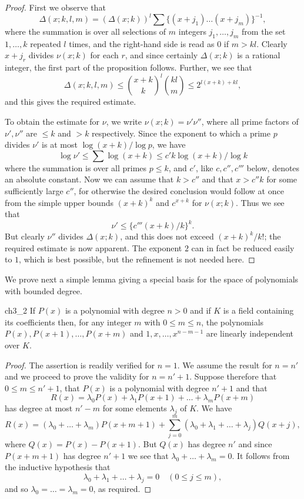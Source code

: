 \begin{proof}
First we observe that
\[
\Delta(x; k, l, m) = (\Delta(x; k))^l \sum \{(x+j_1) \dots (x+j_m)\}^{-1},
\]
where the summation is over all selections of $m$ integers $j_1, \dots, j_m$ from the set $1, \dots, k$ repeated $l$ times, and the right-hand side is read as $0$ if $m > kl$. Clearly $x+j_r$ divides $\nu(x;k)$ for each $r$, and since certainly $\Delta(x;k)$ is a rational integer, the first part of the proposition follows. Further, we see that
\[
\Delta(x; k, l, m) \le \binom{x+k}{k}^l \binom{kl}{m} \le 2^{l(x+k)+kl},
\]
and this gives the required estimate.

To obtain the estimate for $\nu$, we write $\nu(x; k) = \nu' \nu''$, where all prime factors of $\nu', \nu''$ are $\le k$ and $> k$ respectively. Since the exponent to which a prime $p$ divides $\nu'$ is at most $\log (x+k)/\log p$, we have
\[
\log \nu' \le \sum \log (x+k) \le c' k \log (x+k)/\log k
\]
where the summation is over all primes $p \le k$, and $c'$, like $c, c'', c'''$ below, denotes an absolute constant. Now we can assume that $k > c''$ and that $x > c''k$ for some sufficiently large $c''$, for otherwise the desired conclusion would follow at once from the simple upper bounds $(x+k)^k$ and $c^{x+k}$ for $\nu(x;k)$. Thus we see that
\[
\nu' \le \{c'''(x+k)/k\}^k.
\]
But clearly $\nu''$ divides $\Delta(x; k)$, and this does not exceed $(x+k)^k/k!$; the required estimate is now apparent. The exponent $2$ can in fact be reduced easily to $1$, which is best possible, but the refinement is not needed here.
\end{proof}

We prove next a simple lemma giving a special basis for the space of polynomials with bounded degree.

\begin{mylemma}{}{ch3_2}
If $P(x)$ is a polynomial with degree $n > 0$ and if $K$ is a field containing its coefficients then, for any integer $m$ with $0 \le m \le n$, the polynomials $P(x), P(x+1), \dots, P(x+m)$ and $1, x, \dots, x^{n-m-1}$ are linearly independent over $K$.
\end{mylemma}

\begin{proof}
The assertion is readily verified for $n = 1$. We assume the result for $n = n'$ and we proceed to prove the validity for $n = n' + 1$. Suppose therefore that $0 \le m \le n' + 1$, that $P(x)$ is a polynomial with degree $n' + 1$ and that
\[
R(x) = \lambda_0 P(x) + \lambda_1 P(x+1) + \dots + \lambda_m P(x+m)
\]
has degree at most $n'-m$ for some elements $\lambda_j$ of $K$. We have
\[
R(x) = (\lambda_0 + \dots + \lambda_m) P(x+m+1) + \sum_{j=0}^m (\lambda_0 + \lambda_1 + \dots + \lambda_j) Q(x+j),
\]
where $Q(x) = P(x) - P(x+1)$. But $Q(x)$ has degree $n'$ and since $P(x+m+1)$ has degree $n'+1$ we see that $\lambda_0 + \dots + \lambda_m = 0$. It follows from the inductive hypothesis that
\[
\lambda_0 + \lambda_1 + \dots + \lambda_j = 0 \quad (0 \le j \le m),
\]
and so $\lambda_0 = \dots = \lambda_m = 0$, as required.
\end{proof}

